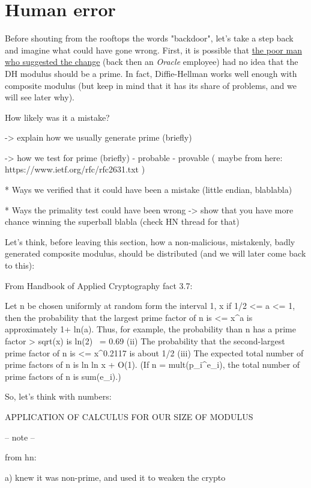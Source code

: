 \documentclass[a4paper,11pt]{article}
\begin{document}
\section{Human error}\label{mistake}

Before shouting from the rooftops the words "backdoor", let's take a step back and imagine what could have gone wrong. First, it is possible that \href{http://repo.or.cz/socat.git/commitdiff/281d1bd6515c2f0f8984fc168fb3d3b91c20bdc0}{the poor man who suggested the change} (back then an \emph{Oracle} employee) had no idea that the DH modulus should be a prime. In fact, Diffie-Hellman works well enough with composite modulus (but keep in mind that it has its share of problems, and we will see later why). 

How likely was it a mistake?

-> explain how we usually generate prime (briefly)

-> how we test for prime (briefly)
    - probable
    - provable
    ( maybe from here: https://www.ietf.org/rfc/rfc2631.txt )

* Ways we verified that it could have been a mistake (little endian, blablabla)

* Ways the primality test could have been wrong -> show that you have more chance winning the superball blabla (check HN thread for that)

Let's think, before leaving this section, how a non-malicious, mistakenly, badly generated composite modulus, should be distributed (and we will later come back to this):

From Handbook of Applied Cryptography fact 3.7:

    Let n be chosen uniformly at random form the interval 1, x if 1/2 <= a <= 1, then the probability that the largest prime factor of n is <= x^a is approximately 1+ ln(a). Thus, for example, the probability than n has a prime factor > sqrt(x) is ln(2) ~= 0.69 (ii) The probability that the second-largest prime factor of n is <= x^{0.2117} is about 1/2 (iii) The expected total number of prime factors of n is ln ln x + O(1). (If n = mult(p_i^{e_i}), the total number of prime factors of n is sum(e_i).)

So, let's think with numbers:

APPLICATION OF CALCULUS FOR OUR SIZE OF MODULUS


-- note --

from hn:


a) knew it was non-prime, and used it to weaken the crypto
\end{document}
